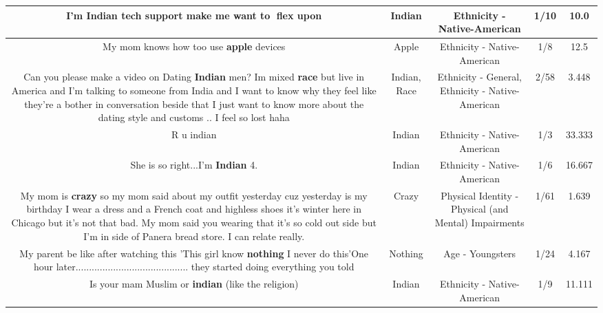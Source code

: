 \documentclass[11pt]{article}
\newlength\mylength
\begin{document}
\begin{center}
\begin{longtable}{|C{.65\mylength}|C{.30\mylength}|C{.12\mylength}|C{.12\mylength}|C{.12\mylength}|}
  \small I'm \textbf{Indian} tech support make me want to 💪flex upon\normalsize   & Indian & Ethnicity - Native-American & 1/10 & 10.0 \\  \hline
  \small My mom knows how too use \textbf{apple} devices\normalsize   & Apple & Ethnicity - Native-American & 1/8 & 12.5 \\  \hline
  \small Can you please make a video on Dating \textbf{Indian} men? Im mixed \textbf{race} but live in America and I'm talking to someone from India and I want to  know why they feel like they're a bother in conversation beside that I just want to know more about the dating style and  customs .. I feel so lost haha\normalsize   & Indian, Race & Ethnicity - General, Ethnicity - Native-American & 2/58 & 3.448 \\  \hline
  \small R u indian\normalsize   & Indian & Ethnicity - Native-American & 1/3 & 33.333 \\  \hline
  \small She is so right...I'm \textbf{Indian} 4.\normalsize   & Indian & Ethnicity - Native-American & 1/6 & 16.667 \\  \hline
  \small My mom is \textbf{crazy} so my mom said about my outfit yesterday  cuz yesterday is my birthday  I wear a dress and a French coat  and highless shoes it's winter here in Chicago but it's not that bad. My mom said you wearing that it's so cold out side but I'm in side of Panera bread store. I can relate really.\normalsize   & Crazy & Physical Identity - Physical (and Mental) Impairments & 1/61 & 1.639 \\  \hline
  \small My parent be like after watching this 'This girl know \textbf{nothing} I never do this'One hour later.......................................... they started doing everything you told\normalsize   & Nothing & Age - Youngsters & 1/24 & 4.167 \\  \hline
  \small Is your mam Muslim or \textbf{indian} (like the religion)\normalsize   & Indian & Ethnicity - Native-American & 1/9 & 11.111 \\  \hline

\end{longtable}
\end{center}
\end{document}
